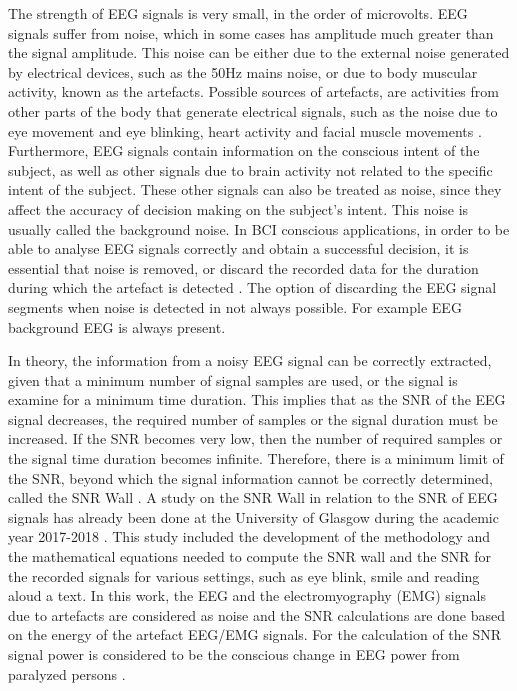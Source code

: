 The strength of EEG signals is very small, in the order of microvolts. EEG signals suffer from noise, which in some cases has amplitude much greater than the signal amplitude. This noise can be either due to the external noise generated by electrical devices, such as the 50Hz mains noise, or due to body muscular activity, known as the artefacts. Possible sources of artefacts, are activities from other parts of the body that generate electrical signals, such as the noise due to eye movement and eye blinking, heart activity and facial muscle movements  \citep{Yong2008}. Furthermore, EEG signals contain information on the conscious intent of the subject, as well as other signals due to brain activity not related to the specific intent of the subject. These other signals can also be treated as noise, since they affect the accuracy of decision making on the subject’s intent. This noise is usually called the background noise. In BCI conscious applications, in order to be able to analyse EEG signals correctly and obtain a successful decision, it is essential that noise is removed, or discard the recorded data for the duration during which the artefact is detected  \citep{Balbir2017,Repovs2010}. The option of discarding the EEG signal segments when noise is detected in not always possible. For example EEG background EEG is always present.  

In theory, the information from a noisy EEG signal can be correctly extracted, given that a minimum number of signal samples are used, or the signal is examine for a minimum time duration. This implies that as the SNR of the EEG signal decreases, the required number of samples or the signal duration must be increased. If the SNR becomes very low, then the number of required samples or the signal time duration becomes infinite. Therefore, there is a minimum limit of the SNR, beyond which the signal information cannot be correctly determined, called the SNR Wall \citep{Tandra2008a,Kustra2017,Tandra2008b}. A study on the SNR Wall in relation to the SNR of EEG signals has already been done at the University of Glasgow during the academic year 2017-2018 \citep{Porr2018}. This study included the development of the methodology and the mathematical equations needed to compute the SNR wall and the SNR for the recorded signals for various settings, such as eye blink, smile and reading aloud a text. In this work, the EEG and the electromyography (EMG) signals due to artefacts are considered as noise and the SNR calculations are done based on the energy of the artefact EEG/EMG signals. For the calculation of the SNR signal power is considered to be the conscious change in EEG power from paralyzed persons \citep{Whitham2007}.
    
